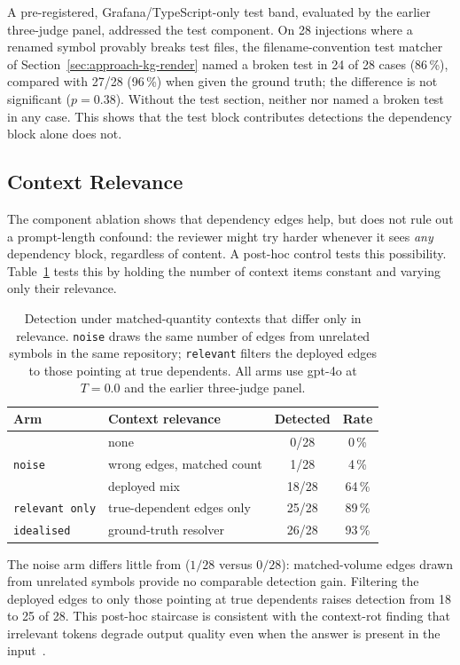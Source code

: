 A pre-registered, Grafana/TypeScript-only test band, evaluated by the earlier
three-judge panel, addressed the test component. On 28 injections where a
renamed symbol provably breaks test files, the filename-convention test
matcher of Section~\ref{sec:approach-kg-render} named a broken test in 24 of 28 cases (86\,\%), compared with 27/28 (96\,\%)
when given the ground truth; the difference is not significant ($p = 0.38$).
Without the test
section, neither \baseline{} nor \kg{} named a broken test in any case. This
shows that the test block contributes detections the dependency block alone
does not.

\subsection{Context Relevance}
\label{sec:results-context-relevance}

The component ablation shows that dependency edges help, but does not rule
out a prompt-length confound: the reviewer might try harder whenever it sees
\emph{any} dependency block, regardless of content. A post-hoc control tests
this possibility.
Table~\ref{tab:exp2-signal-noise} tests this by holding the number of
context items constant and varying only their relevance.

\begin{table}[htbp]
    \centering
    \caption{Detection under matched-quantity contexts that differ only in
        relevance. \texttt{noise} draws the same number of edges from
        unrelated symbols in the same repository; \texttt{relevant} filters
        the deployed edges to those pointing at true dependents.
        All arms use gpt-4o at $T=0.0$ and the earlier three-judge panel.}
    \label{tab:exp2-signal-noise}
    \begin{tabular}{llcc}
        \toprule
        Arm & Context relevance & Detected & Rate \\
        \midrule
        \baseline{}             & none             & 0/28  & 0\,\% \\
        \texttt{noise}          & wrong edges, matched count & 1/28  & 4\,\% \\
        \kg{}                   & deployed mix     & 18/28 & 64\,\% \\
        \texttt{relevant only}  & true-dependent edges only & 25/28 & 89\,\% \\
        \texttt{idealised}      & ground-truth resolver & 26/28 & 93\,\% \\
        \bottomrule
    \end{tabular}
\end{table}

The noise arm differs little from \baseline{} ($1/28$ versus $0/28$):
matched-volume edges drawn from unrelated symbols provide no comparable
detection gain. Filtering the deployed edges to only those pointing at true
dependents raises detection from 18 to 25 of 28. This post-hoc staircase is
consistent with the context-rot finding that
irrelevant tokens degrade output quality even when the answer is present in
the input~\cite{hong2025contextrot, gupta2025contextlength}.